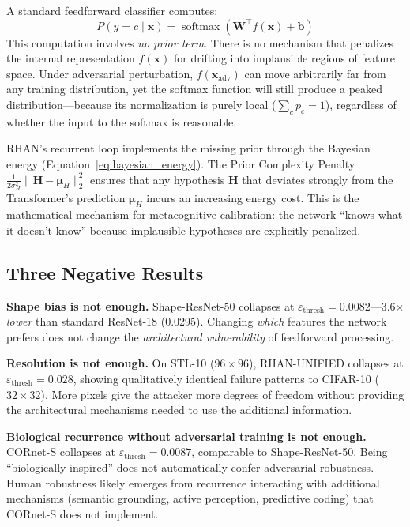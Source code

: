 \documentclass[12pt,a4paper]{article}
\begin{document}
A standard feedforward classifier computes:
\begin{equation}
  P(y = c \mid \mathbf{x}) = \operatorname{softmax}(\mathbf{W}^\top f(\mathbf{x}) + \mathbf{b})
\end{equation}
This computation involves \textit{no prior term}. There is no mechanism
that penalizes the internal representation $f(\mathbf{x})$ for drifting
into implausible regions of feature space. Under adversarial perturbation,
$f(\mathbf{x}_{\text{adv}})$ can move arbitrarily far from any training
distribution, yet the softmax function will still produce a peaked
distribution---because its normalization is purely local
($\sum_c p_c = 1$), regardless of whether the input to the softmax
is reasonable.

RHAN's recurrent loop implements the missing prior through the Bayesian energy
(Equation~\ref{eq:bayesian_energy}). The Prior Complexity Penalty
$\frac{1}{2\sigma_H^2}\|\mathbf{H} - \bm{\mu}_H\|_2^2$ ensures that any
hypothesis $\mathbf{H}$ that deviates strongly from the Transformer's
prediction $\bm{\mu}_H$ incurs an increasing energy cost. This is the
mathematical mechanism for metacognitive calibration: the network ``knows
what it doesn't know'' because implausible hypotheses are explicitly
penalized.

\subsection{Three Negative Results}

\textbf{Shape bias is not enough.} Shape-ResNet-50 collapses at
$\varepsilon_{\text{thresh}}{=}0.0082$---3.6$\times$ \textit{lower} than
standard ResNet-18 (0.0295). Changing \textit{which} features the network
prefers does not change the \textit{architectural vulnerability} of
feedforward processing.

\textbf{Resolution is not enough.} On STL-10 ($96{\times}96$), RHAN-UNIFIED
collapses at $\varepsilon_{\text{thresh}}{=}0.028$, showing qualitatively
identical failure patterns to CIFAR-10 ($32{\times}32$). More pixels give the
attacker more degrees of freedom without providing the architectural
mechanisms needed to use the additional information.

\textbf{Biological recurrence without adversarial training is not enough.}
CORnet-S collapses at $\varepsilon_{\text{thresh}}{=}0.0087$, comparable to
Shape-ResNet-50. Being ``biologically inspired'' does not automatically confer
adversarial robustness. Human robustness likely emerges from recurrence
interacting with additional mechanisms (semantic grounding, active perception,
predictive coding) that CORnet-S does not implement.
\end{document}
